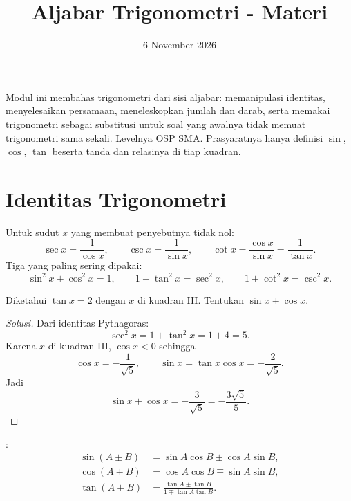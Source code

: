 \documentclass[12pt]{scrartcl}
\title{Aljabar Trigonometri - Materi}
\date{6 November 2026}
\begin{document}
\maketitle

\renewcommand*\contentsname{Daftar Isi}
\tableofcontents

\newpage

Modul ini membahas trigonometri dari sisi aljabar: memanipulasi identitas,
menyelesaikan persamaan, meneleskopkan jumlah dan darab, serta memakai
trigonometri sebagai substitusi untuk soal yang awalnya tidak memuat
trigonometri sama sekali. Levelnya OSP SMA. Prasyaratnya hanya definisi
$\sin$, $\cos$, $\tan$ beserta tanda dan relasinya di tiap kuadran.

\section{Identitas Trigonometri}

\begin{definition}
Untuk sudut $x$ yang membuat penyebutnya tidak nol:
\[ \sec x = \frac{1}{\cos x}, \qquad \csc x = \frac{1}{\sin x},
\qquad \cot x = \frac{\cos x}{\sin x} = \frac{1}{\tan x}. \]
Tiga  yang paling sering dipakai:
\[ \sin^2 x + \cos^2 x = 1, \qquad 1 + \tan^2 x = \sec^2 x,
\qquad 1 + \cot^2 x = \csc^2 x. \]
\end{definition}

\begin{example}
Diketahui $\tan x = 2$ dengan $x$ di kuadran III. Tentukan $\sin x + \cos x$.
\end{example}
\begin{proof}[Solusi]
Dari identitas Pythagoras:
\[ \sec^2 x = 1 + \tan^2 x = 1 + 4 = 5. \]
Karena $x$ di kuadran III, $\cos x < 0$ sehingga
\[ \cos x = -\frac{1}{\sqrt{5}}, \qquad
\sin x = \tan x \cos x = -\frac{2}{\sqrt{5}}. \]
Jadi
\[ \sin x + \cos x = -\frac{3}{\sqrt{5}} = -\frac{3\sqrt{5}}{5}. \]
\end{proof}

\begin{theorem}
:
\begin{align*}
\sin(A \pm B) &= \sin A \cos B \pm \cos A \sin B, \\
\cos(A \pm B) &= \cos A \cos B \mp \sin A \sin B, \\
\tan(A \pm B) &= \frac{\tan A \pm \tan B}{1 \mp \tan A \tan B}.
\end{align*}
\end{theorem}
\end{document}
